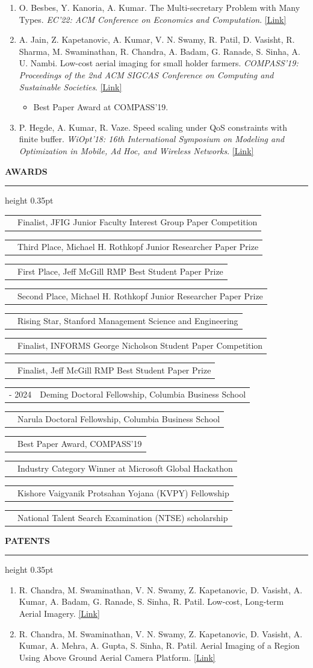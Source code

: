 \documentclass[11pt,letterpaper]{article}
\makeatletter
\newcommand{\cvsection}[1]{%
  \Needspace{8\baselineskip}%
  \vspace{1.05em}%
  {\fontsize{14}{16}\selectfont\bfseries\MakeUppercase{#1}}\par
  \vspace{2pt}%
  \hrule height 0.35pt
  \vspace{0.72em}%
}
\newcommand{\cvaward}[2]{%
  \noindent
  \begin{tabularx}{\textwidth}{@{}>{\raggedright\arraybackslash}p{1.55in}@{\hspace{0.25in}}>{\raggedright\arraybackslash}X@{}}
    #1 & #2
  \end{tabularx}\par
  \vspace{0.18em}%
}
\newenvironment{cvpubs}{%
  \begin{enumerate}[
    leftmargin=0.75in,
    labelwidth=0.28in,
    labelsep=0.22in,
    align=left,
    itemsep=0.62em,
    topsep=0.15em,
    parsep=0pt
  ]
}{\end{enumerate}}
\newenvironment{cvnotes}{%
  \begin{itemize}[
    label=\textbullet,
    leftmargin=1.85em,
    labelsep=0.45em,
    itemsep=0.1em,
    topsep=0.18em,
    parsep=0pt
  ]
}{\end{itemize}}
\newcommand{\talkvenuefont}{\fontsize{9.1}{10.5}\selectfont}
\newenvironment{cvpubnotes}{%
  \begin{cvnotes}%
  \talkvenuefont
}{%
  \end{cvnotes}%
}
\makeatother
\begin{document}
\begin{cvpubs}
  \item O. Besbes, Y. Kanoria, A. Kumar. The Multi-secretary Problem with Many Types. \textit{EC'22: ACM Conference on Economics and Computation}. \href{https://dl.acm.org/doi/10.1145/3490486.3538371}{[Link]}

  \item A. Jain, Z. Kapetanovic, A. Kumar, V. N. Swamy, R. Patil, D. Vasisht, R. Sharma, M. Swaminathan, R. Chandra, A. Badam, G. Ranade, S. Sinha, A. U. Nambi. Low-cost aerial imaging for small holder farmers. \textit{COMPASS'19: Proceedings of the 2nd ACM SIGCAS Conference on Computing and Sustainable Societies}. \href{https://dl.acm.org/doi/10.1145/3314344.3332485}{[Link]}
  \begin{cvpubnotes}
    \item Best Paper Award at COMPASS'19.
  \end{cvpubnotes}

  \item P. Hegde, A. Kumar, R. Vaze. Speed scaling under QoS constraints with finite buffer. \textit{WiOpt'18: 16th International Symposium on Modeling and Optimization in Mobile, Ad Hoc, and Wireless Networks}. \href{https://ieeexplore.ieee.org/abstract/document/8362845}{[Link]}
\end{cvpubs}

\cvsection{Awards}
\cvaward{2026}{Finalist, JFIG Junior Faculty Interest Group Paper Competition}
\cvaward{2025}{Third Place, Michael H. Rothkopf Junior Researcher Paper Prize}
\cvaward{2024}{First Place, Jeff McGill RMP Best Student Paper Prize}
\cvaward{2024}{Second Place, Michael H. Rothkopf Junior Researcher Paper Prize}
\cvaward{2024}{Rising Star, Stanford Management Science and Engineering}
\cvaward{2023}{Finalist, INFORMS George Nicholson Student Paper Competition}
\cvaward{2023}{Finalist, Jeff McGill RMP Best Student Paper Prize}
\cvaward{2023 - 2024}{Deming Doctoral Fellowship, Columbia Business School}
\cvaward{2023}{Narula Doctoral Fellowship, Columbia Business School}
\cvaward{2019}{Best Paper Award, COMPASS'19}
\cvaward{2016}{Industry Category Winner at Microsoft Global Hackathon}
\cvaward{2014}{Kishore Vaigyanik Protsahan Yojana (KVPY) Fellowship}
\cvaward{2011}{National Talent Search Examination (NTSE) scholarship}

\cvsection{Patents}
\begin{cvpubs}
  \item R. Chandra, M. Swaminathan, V. N. Swamy, Z. Kapetanovic, D. Vasisht, A. Kumar, A. Badam, G. Ranade, S. Sinha, R. Patil. Low-cost, Long-term Aerial Imagery. \href{https://patents.google.com/patent/US20180213186A1/en}{[Link]}

  \item R. Chandra, M. Swaminathan, V. N. Swamy, Z. Kapetanovic, D. Vasisht, A. Kumar, A. Mehra, A. Gupta, S. Sinha, R. Patil. Aerial Imaging of a Region Using Above Ground Aerial Camera Platform. \href{https://patents.google.com/patent/US20180213187A1/en}{[Link]}
\end{cvpubs}
\end{document}
